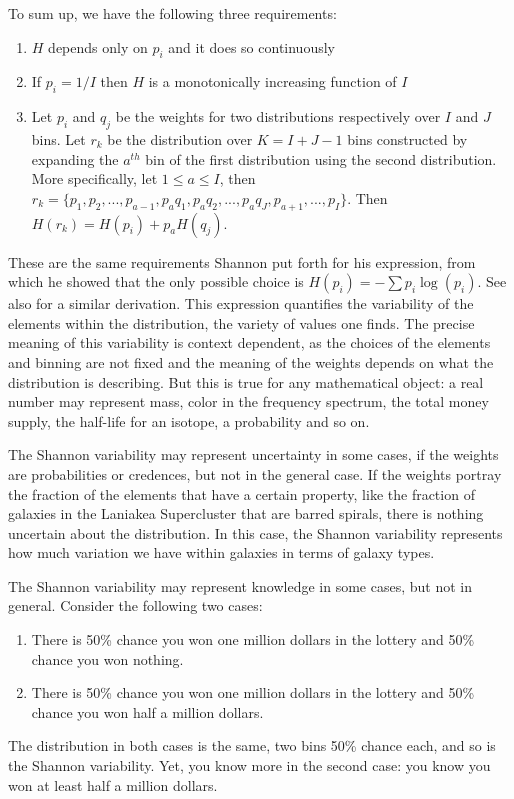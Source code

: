 \documentclass[iopart]{revtex4-1}
\begin{document}
To sum up, we have the following three requirements:
\begin{enumerate}
\item $H$ depends only on $p_i$ and it does so continuously
\item If $p_i=1/I$ then $H$ is a monotonically increasing function of $I$
\item Let $p_i$ and $q_j$ be the weights for two distributions respectively over $I$ and $J$ bins. Let $r_k$ be the distribution over $K=I+J-1$ bins constructed by expanding the $a^{th}$ bin of the first distribution using the second distribution. More specifically, let $1 \leq a \leq I$, then $r_k = \{p_1, p_2, ..., p_{a-1}, p_{a}q_1, p_{a}q_2, ..., p_{a}q_J, p_{a+1}, ..., p_I \}$. Then $H(r_k) = H(p_i) + p_{a} H(q_j)$.
\end{enumerate}
These are the same requirements Shannon put forth for his expression\cite{Shannon}, from which he showed that the only possible choice is $H(p_i) = - \sum p_i \log(p_i)$. See also \cite{khinchin2013mathematical} for a similar derivation. This expression quantifies the variability of the elements within the distribution, the variety of values one finds. The precise meaning of this variability is context dependent, as the choices of the elements and binning are not fixed and the meaning of the weights depends on what the distribution is describing. But this is true for any mathematical object: a real number may represent mass, color in the frequency spectrum, the total money supply, the half-life for an isotope, a probability and so on.

The Shannon variability may represent uncertainty in some cases, if the weights are probabilities or credences, but not in the general case. If the weights portray the fraction of the elements that have a certain property, like the fraction of galaxies in the Laniakea Supercluster that are barred spirals, there is nothing uncertain about the distribution. In this case, the Shannon variability represents how much variation we have within galaxies in terms of galaxy types.

The Shannon variability may represent knowledge in some cases, but not in general. Consider the following two cases:
\begin{enumerate}
\item There is 50\% chance you won one million dollars in the lottery and 50\% chance you won nothing.
\item There is 50\% chance you won one million dollars in the lottery and 50\% chance you won half a million dollars.
\end{enumerate}
The distribution in both cases is the same, two bins 50\% chance each, and so is the Shannon variability. Yet, you know more in the second case: you know you won at least half a million dollars.
\end{document}
